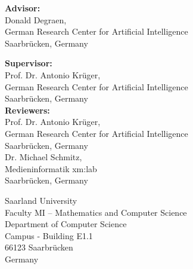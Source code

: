 \pagestyle{empty}

\vspace*{0.5cm}
\textbf{Advisor:}\\
Donald Degraen,\\
German Research Center for Artificial Intelligence\\
Saarbrücken, Germany

\vspace*{1cm}
\textbf{Supervisor:}\\
Prof. Dr. Antonio Krüger,\\
German Research Center for Artificial Intelligence\\
Saarbrücken, Germany\\

\vspace*{1cm}
\textbf{Reviewers:}\\
Prof. Dr. Antonio Krüger,\\
German Research Center for Artificial Intelligence\\
Saarbrücken, Germany\\

Dr. Michael Schmitz,\\
Medieninformatik xm:lab\\
Saarbrücken, Germany

\vspace{3cm}


\vspace{3cm}
Saarland University\\
Faculty MI – Mathematics and Computer Science\\
Department of Computer Science\\
Campus - Building E1.1\\
66123 Saarbrücken\\
Germany\\


